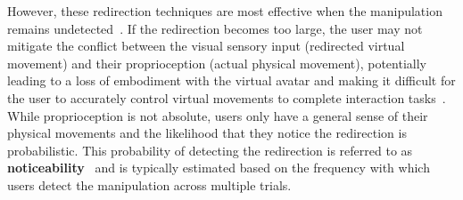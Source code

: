 However, these redirection techniques are most effective when the manipulation remains undetected~\cite{gonzalez2017model, li2022modeling}. 
If the redirection becomes too large, the user may not mitigate the conflict between the visual sensory input (redirected virtual movement) and their proprioception (actual physical movement), potentially leading to a loss of embodiment with the virtual avatar and making it difficult for the user to accurately control virtual movements to complete interaction tasks~\cite{li2022modeling, wentzel2020improving, feuchtner2018ownershift}. 
While proprioception is not absolute, users only have a general sense of their physical movements and the likelihood that they notice the redirection is probabilistic. 
This probability of detecting the redirection is referred to as \textbf{noticeability}~\cite{li2022modeling, zenner2024beyond, zenner2023detectability} and is typically estimated based on the frequency with which users detect the manipulation across multiple trials.


